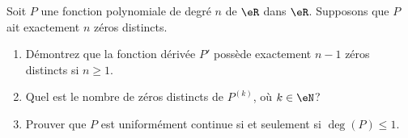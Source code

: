 
\begin{exercice}\label{exo0095}

Soit $P$ une fonction polynomiale de degré $n$ de $\eR$ dans $\eR$. Supposons que $P$ ait exactement $n$ zéros distincts.
\begin{enumerate}
\item
Démontrez que la fonction dérivée $P'$ possède exactement $n-1$ zéros distincts si $n \geq 1$.
\item
Quel est le nombre de zéros distincts de $P^{(k)}$, où $k\in \eN$?
\item
Prouver que $P$ est uniformément continue si et seulement si $\deg(P)\leq1$.
\end{enumerate}

\end{exercice}
